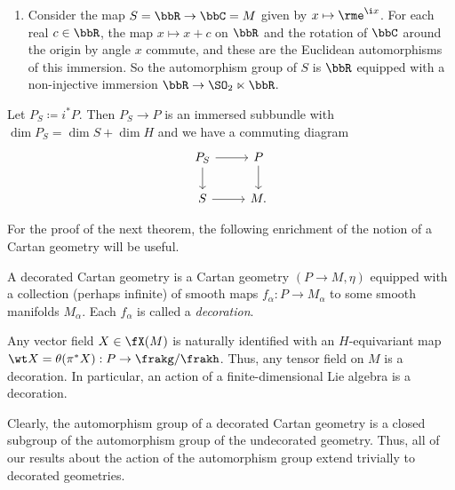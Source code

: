 \begin{example}
\begin{enumerate}
        \item Consider the map $S=\bbR\to \bbC=M$ given by $x\mapsto \rme^{\i x}$. For each real $c\in \bbR$, the map $x\mapsto x+c$ on $\bbR$ and the rotation of $\bbC$ around the origin by angle $x$ commute, and these are the Euclidean automorphisms of this immersion. So the automorphism group of $S$ is $\bbR$ equipped with a non-injective immersion $\bbR\to \SO_2\ltimes\bbR$.
    \end{enumerate}
\end{example}

Let $P_S\coloneqq i^\ast P$. Then $P_S\to P$ is an immersed subbundle with $\dim P_S=\dim S+\dim H$ and we have a commuting diagram 
\[\begin{tikzcd}
    P_S\arrow[r]\arrow[d] & P\arrow[d]\\
    S \arrow[r] & M.
\end{tikzcd}\]

For the proof of the next theorem, the following enrichment of the notion of a Cartan geometry will be useful.

\begin{defn}
    A decorated Cartan geometry is a Cartan geometry $(P\to M,\eta)$ equipped with a collection (perhaps infinite) of smooth maps $f_\alpha:P\to M_\alpha$ to some smooth manifolds $M_\alpha$. Each $f_\alpha$ is called a \emph{decoration}.
\end{defn}

\begin{example}
    Any vector field $X\in\fX(M)$ is naturally identified with an $H$-equivariant map $\wt X=\theta(\pi^\ast X):P\to \frakg\slash\frakh$. Thus, any tensor field on $M$ is a decoration. In particular, an action of a finite-dimensional Lie algebra is a decoration.
\end{example}

Clearly, the automorphism group of a decorated Cartan geometry is a closed subgroup of the automorphism group of the undecorated geometry. Thus, all of our results about the action of the automorphism group extend trivially to decorated geometries.

